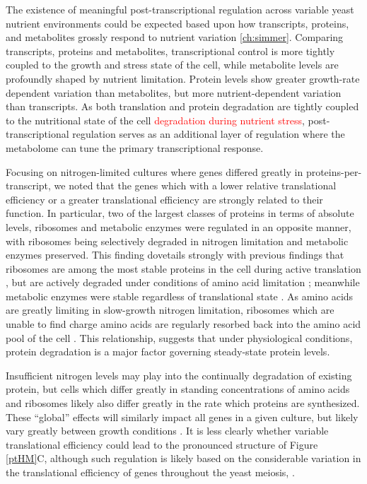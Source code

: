 The existence of meaningful post-transcriptional regulation across variable yeast nutrient environments could be expected based upon how transcripts, proteins, and metabolites \cite{Boer:2010fb} grossly respond to nutrient variation \ref{ch:simmer}. Comparing transcripts, proteins and metabolites, transcriptional control is more tightly coupled to the growth and stress state of the cell, while metabolite levels are profoundly shaped by nutrient limitation. Protein levels show greater growth-rate dependent variation than metabolites, but more nutrient-dependent variation than transcripts. As both translation and protein degradation are tightly coupled to the nutritional state of the cell \cite{Klumpp:2009ic}\textcolor{red}{degradation during nutrient stress}, post-transcriptional regulation serves as an additional layer of regulation where the metabolome can tune the primary transcriptional response.

Focusing on nitrogen-limited cultures where genes differed greatly in proteins-per-transcript, we noted that the genes which with a lower relative translational efficiency or a greater translational efficiency are strongly related to their function.  In particular, two of the largest classes of proteins in terms of absolute levels, ribosomes and metabolic enzymes were regulated in an opposite manner, with ribosomes being selectively degraded in nitrogen limitation and metabolic enzymes preserved.  This finding dovetails strongly with previous findings that ribosomes are among the most stable proteins in the cell during active translation \cite{Belle:2006hv}, but are actively degraded under conditions of amino acid limitation \cite{Natarajan:2001ke, Washburn:2003ff, Zundel:2009dy}; meanwhile metabolic enzymes were stable regardless of translational state \cite{Belle:2006hv}.  As amino acids are greatly limiting in slow-growth nitrogen limitation, ribosomes which are unable to find charge amino acids are regularly resorbed back into the amino acid pool of the cell \cite{Zundel:2009dy, Xu:2013do}.  This relationship, suggests that under physiological conditions, protein degradation is a major factor governing steady-state protein levels.

Insufficient nitrogen levels may play into the continually degradation of existing protein, but cells which differ greatly in standing concentrations of amino acids and ribosomes likely also differ greatly in the rate which proteins are synthesized. These ``global'' effects will similarly impact all genes in a given culture, but likely vary greatly between growth conditions \cite{Klumpp:2009ic}. It is less clearly whether variable translational efficiency could lead to the pronounced structure of Figure \ref{ptHM}C, although such regulation is likely based on the considerable variation in the translational efficiency of genes throughout the yeast meiosis, \cite{Brar:2012ig}. 

